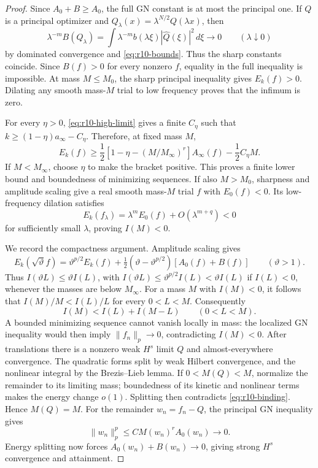 \begin{proof}
Since $A_0+B\ge A_0$, the full GN constant is at most the principal
one. If $Q$ is a principal optimizer and
$Q_\lambda(x)=\lambda^{N/2}Q(\lambda x)$, then
\[
 \lambda^{-m}B(Q_\lambda)
 =\int\lambda^{-m}b(\lambda\xi)|\widehat Q(\xi)|^2\,d\xi
 \longrightarrow0\qquad(\lambda\downarrow0)
\]
by dominated convergence and \eqref{eq:r10-bounds}. Thus the sharp
constants coincide. Since $B(f)>0$ for every nonzero $f$, equality in
the full inequality is impossible. At mass $M\le M_0$, the sharp
principal inequality gives $E_k(f)>0$. Dilating any smooth mass-$M$
trial to low frequency proves that the infimum is zero.

For every $\eta>0$, \eqref{eq:r10-high-limit} gives a finite $C_\eta$
such that $k\ge(1-\eta)a_\infty-C_\eta$. Therefore, at fixed mass $M$,
\begin{equation}\label{eq:r10-coercivity}
 E_k(f)\ge\frac12\left[1-\eta-(M/M_\infty)^r\right]A_\infty(f)
             -\frac12C_\eta M.
\end{equation}
If $M<M_\infty$, choose $\eta$ to make the bracket positive. This
proves a finite lower bound and boundedness of minimizing sequences.
If also $M>M_0$, sharpness and amplitude scaling give a real smooth
mass-$M$ trial $f$ with $E_0(f)<0$. Its low-frequency dilation satisfies
\[
 E_k(f_\lambda)=\lambda^m E_0(f)+O(\lambda^{m+q})<0
\]
for sufficiently small $\lambda$, proving $I(M)<0$.

We record the compactness argument. Amplitude scaling gives
\[
 E_k(\sqrt\vartheta f)
 =\vartheta^{p/2}E_k(f)
   +\tfrac12(\vartheta-\vartheta^{p/2})[A_0(f)+B(f)]
 \qquad(\vartheta>1).
\]
Thus $I(\vartheta L)\le\vartheta I(L)$, with
$I(\vartheta L)\le\vartheta^{p/2}I(L)<\vartheta I(L)$ if $I(L)<0$,
whenever the masses are below $M_\infty$. For a mass $M$ with
$I(M)<0$, it follows that $I(M)/M<I(L)/L$ for every $0<L<M$.
Consequently
\begin{equation}\label{eq:r10-binding}
 I(M)<I(L)+I(M-L)\qquad(0<L<M).
\end{equation}
A bounded minimizing sequence cannot vanish locally in mass: the
localized GN inequality would then imply $\|f_n\|_p\to0$, contradicting
$I(M)<0$. After translations there is a nonzero weak $H^s$ limit $Q$
and almost-everywhere convergence. The quadratic forms split by weak
Hilbert convergence, and the nonlinear integral by the Brezis--Lieb
lemma. If $0<M(Q)<M$, normalize the remainder to its limiting mass;
boundedness of its kinetic and nonlinear terms makes the energy change
$o(1)$. Splitting then contradicts \eqref{eq:r10-binding}. Hence
$M(Q)=M$. For the remainder $w_n=f_n-Q$, the principal GN inequality
gives
\[
 \|w_n\|_p^p\le C M(w_n)^r A_0(w_n)\longrightarrow0.
\]
Energy splitting now forces $A_0(w_n)+B(w_n)\to0$, giving strong $H^s$
convergence and attainment.


\end{proof}
